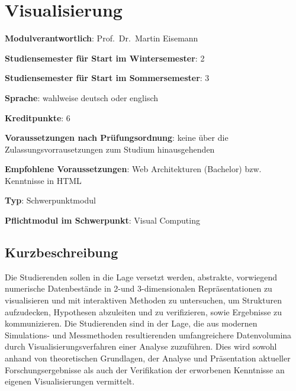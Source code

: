 \chapter{Visualisierung\label{/mi-2017/modulbeschreibungen-master/MA_VC_Modul_Visualisierung}}\label{visualisierungpathlabelmi-2017modulbeschreibungen-mastermaux5fvcux5fmodulux5fvisualisierung}

\begin{modulHead}
\textbf{Modulverantwortlich}: Prof.~Dr.~Martin
Eisemann
\end{modulHead}
\begin{modulHead}
\textbf{Studiensemester für
Start im Wintersemester}:
2
\end{modulHead}
\begin{modulHead}
\textbf{Studiensemester für Start
im Sommersemester}:
3
\end{modulHead}
\begin{modulHead}
\textbf{Sprache}: wahlweise deutsch
oder englisch
\end{modulHead}
\begin{modulHead}
\textbf{Kreditpunkte}:
6
\end{modulHead}
\begin{modulHead}
\textbf{Voraussetzungen nach
Prüfungsordnung}: keine über die Zulassungsvorrausetzungen zum Studium
hinausgehenden
\end{modulHead}
\begin{modulHead}
\textbf{Empfohlene
Voraussetzungen}: Web Architekturen (Bachelor) bzw. Kenntnisse in
HTML
\end{modulHead}
\begin{modulHead}
\textbf{Typ}:
Schwerpunktmodul
\end{modulHead}
\begin{modulHead}
\textbf{Pflichtmodul
im Schwerpunkt}: Visual Computing
\end{modulHead}


\section*{Kurzbeschreibung\label{/mi-2017/modulbeschreibungen-master/MA_VC_Modul_Visualisierung}}\label{kurzbeschreibungpathlabelmi-2017modulbeschreibungen-mastermaux5fvcux5fmodulux5fvisualisierung}

Die Studierenden sollen in die Lage versetzt werden, abstrakte,
vorwiegend numerische Datenbestände in 2-und 3-dimensionalen
Repräsentationen zu visualisieren und mit interaktiven Methoden zu
untersuchen, um Strukturen aufzudecken, Hypothesen abzuleiten und zu
verifizieren, sowie Ergebnisse zu kommunizieren. Die Studierenden sind
in der Lage, die aus modernen Simulations- und Messmethoden
resultierenden umfangreichere Datenvolumina durch
Visualisierungsverfahren einer Analyse zuzuführen. Dies wird sowohl
anhand von theoretischen Grundlagen, der Analyse und Präsentation
aktueller Forschungsergebnisse als auch der Verifikation der erworbenen
Kenntnisse an eigenen Visualisierungen vermittelt.

